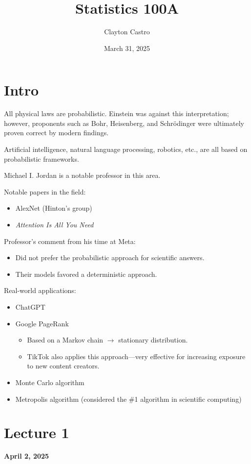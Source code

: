\documentclass[12pt]{article}
\title{Statistics 100A}
\author{Clayton Castro}
\date{March 31, 2025}
\begin{document}
\maketitle

\section*{Intro}

All physical laws are probabilistic.  
Einstein was against this interpretation; however, proponents such as Bohr, Heisenberg, and Schrödinger were ultimately proven correct by modern findings.

Artificial intelligence, natural language processing, robotics, etc., are all based on probabilistic frameworks.

Michael I. Jordan is a notable professor in this area.

Notable papers in the field:
\begin{itemize}
    \item AlexNet (Hinton's group)
    \item \textit{Attention Is All You Need}
\end{itemize}

Professor's comment from his time at Meta:
\begin{itemize}
    \item Did not prefer the probabilistic approach for scientific answers.
    \item Their models favored a deterministic approach.
\end{itemize}

Real-world applications:
\begin{itemize}
    \item ChatGPT
    \item Google PageRank
    \begin{itemize}
        \item Based on a Markov chain $\rightarrow$ stationary distribution.
        \item TikTok also applies this approach—very effective for increasing exposure to new content creators.
    \end{itemize}
    \item Monte Carlo algorithm
    \item Metropolis algorithm (considered the \#1 algorithm in scientific computing)
\end{itemize}

\section{Lecture 1}
\vspace{1em}
\noindent\textbf{\large April 2, 2025}
\end{document}
